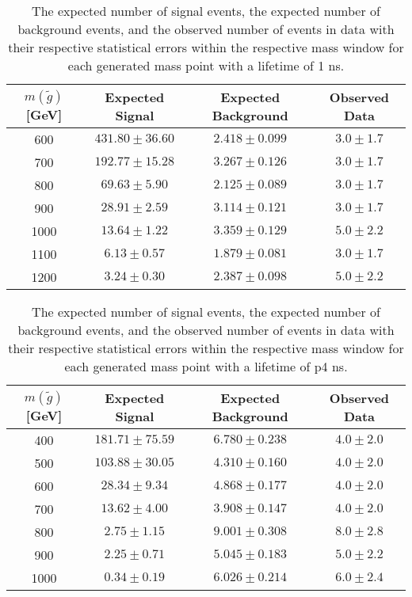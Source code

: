 \begin{table}[!htbp]
  \begin{center}
    \begin{tabular}{cccc}
      \hline
      $m(\tilde{g})$ [GeV]  & Expected Signal & Expected Background & Observed Data\\ 
      \hline
      600    & $431.80 \pm 36.60 $ & $2.418 \pm 0.099 $ & $3.0 \pm 1.7$ \\
      700    & $192.77 \pm 15.28 $ & $3.267 \pm 0.126 $ & $3.0 \pm 1.7$ \\
      800    & $69.63 \pm 5.90 $ & $2.125 \pm 0.089 $ & $3.0 \pm 1.7$ \\
      900    & $28.91 \pm 2.59 $ & $3.114 \pm 0.121 $ & $3.0 \pm 1.7$ \\
      1000    & $13.64 \pm 1.22 $ & $3.359 \pm 0.129 $ & $5.0 \pm 2.2$ \\
      1100    & $6.13 \pm 0.57 $ & $1.879 \pm 0.081 $ & $3.0 \pm 1.7$ \\
      1200    & $3.24 \pm 0.30 $ & $2.387 \pm 0.098 $ & $5.0 \pm 2.2$ \\
      \hline
    \end{tabular}
  \end{center}
  \caption{The expected number of signal events, the expected number of background events, and the observed number of events in data with their respective statistical errors within the respective mass window for each generated mass point with a lifetime of 1 ns.}
  \label{tab:app_counts_1ns}
\end{table}

\begin{table}[!htbp]
  \begin{center}
    \begin{tabular}{cccc}
      \hline
      $m(\tilde{g})$ [GeV]  & Expected Signal & Expected Background & Observed Data\\ 
      \hline
      400    & $181.71 \pm 75.59 $ & $6.780 \pm 0.238 $ & $4.0 \pm 2.0$ \\
      500    & $103.88 \pm 30.05 $ & $4.310 \pm 0.160 $ & $4.0 \pm 2.0$ \\
      600    & $28.34 \pm 9.34 $ & $4.868 \pm 0.177 $ & $4.0 \pm 2.0$ \\
      700    & $13.62 \pm 4.00 $ & $3.908 \pm 0.147 $ & $4.0 \pm 2.0$ \\
      800    & $2.75 \pm 1.15 $ & $9.001 \pm 0.308 $ & $8.0 \pm 2.8$ \\
      900    & $2.25 \pm 0.71 $ & $5.045 \pm 0.183 $ & $5.0 \pm 2.2$ \\
      1000    & $0.34 \pm 0.19 $ & $6.026 \pm 0.214 $ & $6.0 \pm 2.4$ \\
      \hline
    \end{tabular}
  \end{center}
  \caption{The expected number of signal events, the expected number of background events, and the observed number of events in data with their respective statistical errors within the respective mass window for each generated mass point with a lifetime of p4 ns.}
  \label{tab:app_counts_p4ns}
\end{table}


